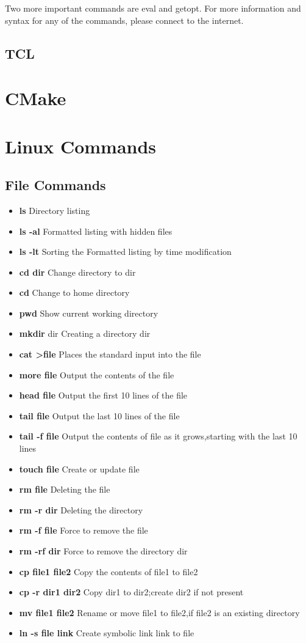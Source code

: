 Two more important commands are eval and getopt. For more information and syntax for any of the commands, please connect to the internet.

\subsection{TCL}
\section{CMake}
\section{Linux Commands}



\subsection{File Commands}

\begin{itemize}
	\item \textbf{ls} Directory listing
	\item \textbf{ls -al} Formatted listing with hidden files
	\item \textbf{ls -lt} Sorting the Formatted listing by time modification
	\item \textbf{cd dir} Change directory to dir
	\item \textbf{cd} Change to home directory
	\item \textbf{pwd} Show current working directory
	\item \textbf{mkdir} dir Creating a directory dir
	\item \textbf{cat >file} Places the standard input into the file
	\item \textbf{more file} Output the contents of the file
	\item \textbf{head file} Output the first 10 lines of the file
	\item \textbf{tail file} Output the last 10 lines of the file
	\item \textbf{tail -f file} Output the contents of file as it grows,starting with the last 10 lines
	\item \textbf{touch file} Create or update file
	\item \textbf{rm file} Deleting the file
	\item \textbf{rm -r dir} Deleting the directory
	\item \textbf{rm -f file} Force to remove the file
	\item \textbf{rm -rf dir} Force to remove the directory dir
	\item \textbf{cp file1 file2} Copy the contents of file1 to file2
	\item \textbf{cp -r dir1 dir2} Copy dir1 to dir2;create dir2 if not present
	\item \textbf{mv file1 file2} Rename or move file1 to file2,if file2 is an existing directory
	\item \textbf{ln -s file link} Create symbolic link link to file 
\end{itemize}

